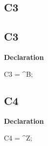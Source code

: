 \documentclass{report}
\newif\ifpdf
\begin{document}
\subsection*{\large{\textbf{C3}}\normalsize\hspace{1ex}\hrulefill}
\else
\subsection*{C3}
\fi
\label{ok_caret_character-C3}
\begin{list}{}{
\setlength{\itemindent}{0cm}
\setlength{\listparindent}{0cm}
\setlength{\leftmargin}{\evensidemargin}
\addtolength{\leftmargin}{\tmplength}
\settowidth{\labelsep}{X}
\addtolength{\leftmargin}{\labelsep}
\setlength{\labelwidth}{\tmplength}
}
\item[\textbf{Declaration}\hfill]
\ifpdf
\begin{flushleft}
\fi
\begin{ttfamily}
C3 = {\^{}}B;\end{ttfamily}

\ifpdf
\end{flushleft}
\fi

\end{list}
\ifpdf
\subsection*{\large{\textbf{C4}}\normalsize\hspace{1ex}\hrulefill}
\else
\subsection*{C4}
\fi
\label{ok_caret_character-C4}
\begin{list}{}{
\setlength{\itemindent}{0cm}
\setlength{\listparindent}{0cm}
\setlength{\leftmargin}{\evensidemargin}
\addtolength{\leftmargin}{\tmplength}
\settowidth{\labelsep}{X}
\addtolength{\leftmargin}{\labelsep}
\setlength{\labelwidth}{\tmplength}
}
\item[\textbf{Declaration}\hfill]
\ifpdf
\begin{flushleft}
\fi
\begin{ttfamily}
C4 = {\^{}}Z;\end{ttfamily}

\ifpdf
\end{flushleft}
\fi

\end{list}
\ifpdf
\end{document}

